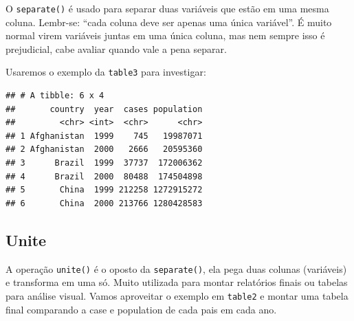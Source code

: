 \documentclass[]{book}
\newenvironment{Shaded}{\begin{snugshade}}{\end{snugshade}}
\newcommand{\KeywordTok}[1]{\textcolor[rgb]{0.13,0.29,0.53}{\textbf{#1}}}
\newcommand{\DataTypeTok}[1]{\textcolor[rgb]{0.13,0.29,0.53}{#1}}
\newcommand{\StringTok}[1]{\textcolor[rgb]{0.31,0.60,0.02}{#1}}
\newcommand{\OperatorTok}[1]{\textcolor[rgb]{0.81,0.36,0.00}{\textbf{#1}}}
\newcommand{\NormalTok}[1]{#1}
\begin{document}
O \texttt{separate()} é usado para separar duas variáveis que estão em
uma mesma coluna. Lembr-se: ``cada coluna deve ser apenas uma única
variável''. É muito normal virem variáveis juntas em uma única coluna,
mas nem sempre isso é prejudicial, cabe avaliar quando vale a pena
separar.

Usaremos o exemplo da \texttt{table3} para investigar:

\begin{Shaded}
\end{Shaded}

\begin{verbatim}
## # A tibble: 6 x 4
##       country  year  cases population
##         <chr> <int>  <chr>      <chr>
## 1 Afghanistan  1999    745   19987071
## 2 Afghanistan  2000   2666   20595360
## 3      Brazil  1999  37737  172006362
## 4      Brazil  2000  80488  174504898
## 5       China  1999 212258 1272915272
## 6       China  2000 213766 1280428583
\end{verbatim}

\subsection{Unite}\label{unite}

A operação \texttt{unite()} é o oposto da \texttt{separate()}, ela pega
duas colunas (variáveis) e transforma em uma só. Muito utilizada para
montar relatórios finais ou tabelas para análise visual. Vamos
aproveitar o exemplo em \texttt{table2} e montar uma tabela final
comparando a case e population de cada pais em cada ano.

\begin{Shaded}
\end{Shaded}
\end{document}
